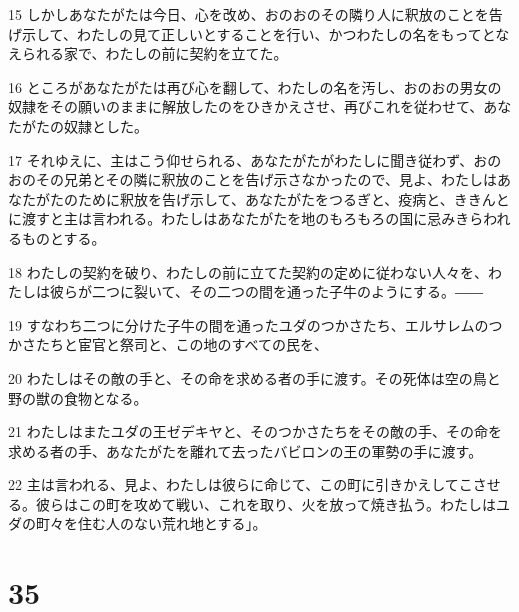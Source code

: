 \par 15 しかしあなたがたは今日、心を改め、おのおのその隣り人に釈放のことを告げ示して、わたしの見て正しいとすることを行い、かつわたしの名をもってとなえられる家で、わたしの前に契約を立てた。
\par 16 ところがあなたがたは再び心を翻して、わたしの名を汚し、おのおの男女の奴隷をその願いのままに解放したのをひきかえさせ、再びこれを従わせて、あなたがたの奴隷とした。
\par 17 それゆえに、主はこう仰せられる、あなたがたがわたしに聞き従わず、おのおのその兄弟とその隣に釈放のことを告げ示さなかったので、見よ、わたしはあなたがたのために釈放を告げ示して、あなたがたをつるぎと、疫病と、ききんとに渡すと主は言われる。わたしはあなたがたを地のもろもろの国に忌みきらわれるものとする。
\par 18 わたしの契約を破り、わたしの前に立てた契約の定めに従わない人々を、わたしは彼らが二つに裂いて、その二つの間を通った子牛のようにする。――
\par 19 すなわち二つに分けた子牛の間を通ったユダのつかさたち、エルサレムのつかさたちと宦官と祭司と、この地のすべての民を、
\par 20 わたしはその敵の手と、その命を求める者の手に渡す。その死体は空の鳥と野の獣の食物となる。
\par 21 わたしはまたユダの王ゼデキヤと、そのつかさたちをその敵の手、その命を求める者の手、あなたがたを離れて去ったバビロンの王の軍勢の手に渡す。
\par 22 主は言われる、見よ、わたしは彼らに命じて、この町に引きかえしてこさせる。彼らはこの町を攻めて戦い、これを取り、火を放って焼き払う。わたしはユダの町々を住む人のない荒れ地とする」。

\chapter{35}


